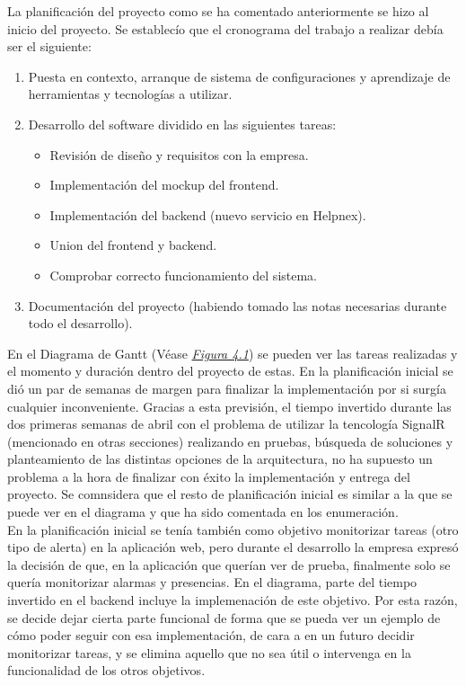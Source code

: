 La planificación del proyecto como se ha comentado anteriormente se hizo al inicio del proyecto. Se establecío que el cronograma del trabajo a realizar debía ser el siguiente:
\begin{enumerate}
    \item Puesta en contexto, arranque de sistema de configuraciones y aprendizaje de herramientas y tecnologías a utilizar.
    \item Desarrollo del software dividido en las siguientes tareas:
    \begin{itemize}
        \item Revisión de diseño y requisitos con la empresa.
        \item Implementación del mockup del frontend.
        \item Implementación del backend (nuevo servicio en Helpnex).
        \item Union del frontend y backend.
        \item Comprobar correcto funcionamiento del sistema.
    \end{itemize}
    \item Documentación del proyecto (habiendo tomado las notas necesarias durante todo el desarrollo).
\end{enumerate}

En el Diagrama de Gantt (Véase \hyperref[fig:gantt]{\textit{Figura 4.1}}) se pueden ver las tareas realizadas y el momento y duración dentro del proyecto de estas. En la planificación inicial se dió un par de semanas de margen para finalizar la implementación por si surgía cualquier inconveniente. Gracias a esta previsión, el tiempo invertido durante las dos primeras semanas de abril con el problema de utilizar la tencología SignalR (mencionado en otras secciones) realizando en pruebas, búsqueda de soluciones y planteamiento de las distintas opciones de la arquitectura, no ha supuesto un problema a la hora de finalizar con éxito la implementación y entrega del proyecto. Se comnsidera que el resto de planificación inicial es similar a la que se puede ver en el diagrama y que ha sido comentada en los enumeración. \\

En la planificación inicial se tenía también como objetivo monitorizar tareas (otro tipo de alerta) en la aplicación web, pero durante el desarrollo la empresa expresó la decisión de que, en la aplicación que querían ver de prueba, finalmente solo se quería monitorizar alarmas y presencias. En el diagrama, parte del tiempo invertido en el backend incluye la implemenación de este objetivo. Por esta razón, se decide dejar cierta parte funcional de forma que se pueda ver un ejemplo de cómo poder seguir con esa implementación, de cara a en un futuro decidir monitorizar tareas, y se elimina aquello que no sea útil o intervenga en la funcionalidad de los otros objetivos.

